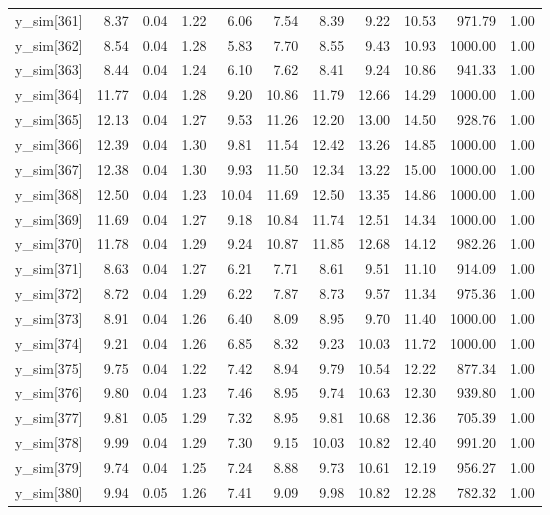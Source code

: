 \begin{table}[ht]
\begin{tabular}{rrrrrrrrrrr}
  y\_sim[361] & 8.37 & 0.04 & 1.22 & 6.06 & 7.54 & 8.39 & 9.22 & 10.53 & 971.79 & 1.00 \\ 
  y\_sim[362] & 8.54 & 0.04 & 1.28 & 5.83 & 7.70 & 8.55 & 9.43 & 10.93 & 1000.00 & 1.00 \\ 
  y\_sim[363] & 8.44 & 0.04 & 1.24 & 6.10 & 7.62 & 8.41 & 9.24 & 10.86 & 941.33 & 1.00 \\ 
  y\_sim[364] & 11.77 & 0.04 & 1.28 & 9.20 & 10.86 & 11.79 & 12.66 & 14.29 & 1000.00 & 1.00 \\ 
  y\_sim[365] & 12.13 & 0.04 & 1.27 & 9.53 & 11.26 & 12.20 & 13.00 & 14.50 & 928.76 & 1.00 \\ 
  y\_sim[366] & 12.39 & 0.04 & 1.30 & 9.81 & 11.54 & 12.42 & 13.26 & 14.85 & 1000.00 & 1.00 \\ 
  y\_sim[367] & 12.38 & 0.04 & 1.30 & 9.93 & 11.50 & 12.34 & 13.22 & 15.00 & 1000.00 & 1.00 \\ 
  y\_sim[368] & 12.50 & 0.04 & 1.23 & 10.04 & 11.69 & 12.50 & 13.35 & 14.86 & 1000.00 & 1.00 \\ 
  y\_sim[369] & 11.69 & 0.04 & 1.27 & 9.18 & 10.84 & 11.74 & 12.51 & 14.34 & 1000.00 & 1.00 \\ 
  y\_sim[370] & 11.78 & 0.04 & 1.29 & 9.24 & 10.87 & 11.85 & 12.68 & 14.12 & 982.26 & 1.00 \\ 
  y\_sim[371] & 8.63 & 0.04 & 1.27 & 6.21 & 7.71 & 8.61 & 9.51 & 11.10 & 914.09 & 1.00 \\ 
  y\_sim[372] & 8.72 & 0.04 & 1.29 & 6.22 & 7.87 & 8.73 & 9.57 & 11.34 & 975.36 & 1.00 \\ 
  y\_sim[373] & 8.91 & 0.04 & 1.26 & 6.40 & 8.09 & 8.95 & 9.70 & 11.40 & 1000.00 & 1.00 \\ 
  y\_sim[374] & 9.21 & 0.04 & 1.26 & 6.85 & 8.32 & 9.23 & 10.03 & 11.72 & 1000.00 & 1.00 \\ 
  y\_sim[375] & 9.75 & 0.04 & 1.22 & 7.42 & 8.94 & 9.79 & 10.54 & 12.22 & 877.34 & 1.00 \\ 
  y\_sim[376] & 9.80 & 0.04 & 1.23 & 7.46 & 8.95 & 9.74 & 10.63 & 12.30 & 939.80 & 1.00 \\ 
  y\_sim[377] & 9.81 & 0.05 & 1.29 & 7.32 & 8.95 & 9.81 & 10.68 & 12.36 & 705.39 & 1.00 \\ 
  y\_sim[378] & 9.99 & 0.04 & 1.29 & 7.30 & 9.15 & 10.03 & 10.82 & 12.40 & 991.20 & 1.00 \\ 
  y\_sim[379] & 9.74 & 0.04 & 1.25 & 7.24 & 8.88 & 9.73 & 10.61 & 12.19 & 956.27 & 1.00 \\ 
  y\_sim[380] & 9.94 & 0.05 & 1.26 & 7.41 & 9.09 & 9.98 & 10.82 & 12.28 & 782.32 & 1.00 \\ 

\end{tabular}
\end{table}

